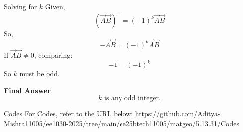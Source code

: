 \documentclass{beamer}
\begin{document}
\begin{frame}{Solving for \(k\)}
Given,
\[
(\vec{A}\vec{B})^\top = (-1)^k\vec{A}\vec{B}
\]
So,
\[
- \vec{A}\vec{B} = (-1)^k \vec{A}\vec{B}
\]
If \(\vec{A}\vec{B} \neq 0\), comparing:
\[
-1 = (-1)^k
\]
So \(k\) must be odd.
\end{frame}

\begin{frame}{\textbf{Final Answer}}
\[
\boxed{
k \text{ is any odd integer}.
}
\]
\end{frame}

\begin{frame}{Codes}
\centering
For Codes, refer to the URL below:  
\url{https://github.com/Aditya-Mishra11005/ee1030-2025/tree/main/ee25btech11005/matgeo/5.13.31/Codes}
\end{frame}
\end{document}
